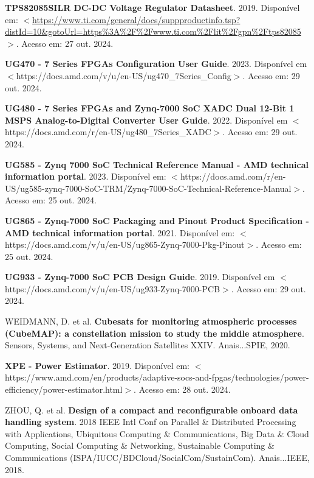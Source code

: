 \begin{flushleft}
\begin{thebibliography}{00}
 \textbf{TPS82085SILR DC-DC Voltage Regulator Datasheet}. 2019. Disponível em: $<$\url{https://www.ti.com/general/docs/suppproductinfo.tsp?distId=10\&gotoUrl=https\%3A\%2F\%2Fwww.ti.com\%2Flit\%2Fgpn\%2Ftps82085}$>$. Acesso em: 27 out. 2024. 

 \textbf{UG470 - 7 Series FPGAs Configuration User Guide}. 2023. Disponível em $<$https://docs.amd.com/v/u/en-US/ug470\_7Series\_Config$>$. Acesso em: 29 out. 2024.

 \textbf{UG480 - 7 Series FPGAs and Zynq-7000 SoC XADC Dual 12-Bit 1 MSPS Analog-to-Digital Converter User Guide}. 2022. Disponível em $<$https://docs.amd.com/r/en-US/ug480\_7Series\_XADC$>$. Acesso em: 29 out. 2024.

 \textbf{UG585 - Zynq 7000 SoC Technical Reference Manual - AMD technical information portal}. 2023. Disponível em: $<$https://docs.amd.com/r/en-US/ug585-zynq-7000-SoC-TRM/Zynq-7000-SoC-Technical-Reference-Manual$>$. Acesso em: 25 out. 2024.

 \textbf{UG865 - Zynq-7000 SoC Packaging and Pinout Product Specification - AMD technical information portal}. 2021. Disponível em: $<$https://docs.amd.com/v/u/en-US/ug865-Zynq-7000-Pkg-Pinout$>$. Acesso em: 25 out. 2024.

 \textbf{UG933 - Zynq-7000 SoC PCB Design Guide}. 2019. Disponível em $<$https://docs.amd.com/v/u/en-US/ug933-Zynq-7000-PCB$>$. Acesso em: 29 out. 2024.

 WEIDMANN, D. et al. \textbf{Cubesats for monitoring atmospheric processes (CubeMAP): a constellation mission to study the middle atmosphere}. Sensors, Systems, and Next-Generation Satellites XXIV. Anais...SPIE, 2020.

 \textbf{XPE - Power Estimator}. 2019. Disponível em: $<$https://www.amd.com/en/products/adaptive-socs-and-fpgas/technologies/power-efficiency/power-estimator.html$>$. Acesso em: 28 out. 2024.

 ZHOU, Q. et al. \textbf{Design of a compact and reconfigurable onboard data handling system}. 2018 IEEE Intl Conf on Parallel \& Distributed Processing with Applications, Ubiquitous Computing \& Communications, Big Data \& Cloud Computing, Social Computing \& Networking, Sustainable Computing \& Communications (ISPA/IUCC/BDCloud/SocialCom/SustainCom). Anais...IEEE, 2018.



\end{thebibliography}
\end{flushleft}

